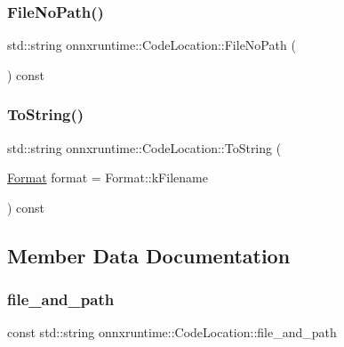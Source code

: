 \subsubsection{\texorpdfstring{File\+No\+Path()}{FileNoPath()}}
{\footnotesize\ttfamily std\+::string onnxruntime\+::\+Code\+Location\+::\+File\+No\+Path (\begin{DoxyParamCaption}{ }\end{DoxyParamCaption}) const\hspace{0.3cm}{\ttfamily [inline]}}

\mbox{\label{structonnxruntime_1_1CodeLocation_ae4effa4d5b551364e9e7255798df3a2d}} 
\subsubsection{\texorpdfstring{To\+String()}{ToString()}}
{\footnotesize\ttfamily std\+::string onnxruntime\+::\+Code\+Location\+::\+To\+String (\begin{DoxyParamCaption}\item[{\mbox{\hyperlink{structonnxruntime_1_1CodeLocation_a3fb5bf51b3528e696939e0c2daac28d5}{Format}}}]{format = {\ttfamily Format\+:\+:kFilename} }\end{DoxyParamCaption}) const\hspace{0.3cm}{\ttfamily [inline]}}



\subsection{Member Data Documentation}
\mbox{\label{structonnxruntime_1_1CodeLocation_aeed1a7d30e1e239744907a5ed83072e7}} 
\subsubsection{\texorpdfstring{file\+\_\+and\+\_\+path}{file\_and\_path}}
{\footnotesize\ttfamily const std\+::string onnxruntime\+::\+Code\+Location\+::file\+\_\+and\+\_\+path}

